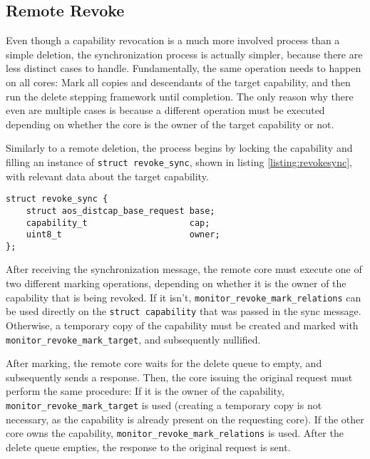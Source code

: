 \subsection{Remote Revoke}
Even though a capability revocation is a much more involved process than a simple deletion, the synchronization process is actually simpler, because there are less distinct cases to handle. Fundamentally, the same operation needs to happen on all cores: Mark all copies and descendants of the target capability, and then run the delete stepping framework until completion. The only reason why there even are multiple cases is because a different operation must be executed depending on whether the core is the owner of the target capability or not.

Similarly to a remote deletion, the process begins by locking the capability and filling an instance of \texttt{struct revoke\_sync}, shown in listing \ref{listing:revokesync}, with relevant data about the target capability.

\begin{lstlisting}[caption={Payload for revoke synchronization},label={listing:revokesync}]
struct revoke_sync {
    struct aos_distcap_base_request base;
    capability_t                    cap;
    uint8_t                         owner;
};
\end{lstlisting}

After receiving the synchronization message, the remote core must execute one of two different marking operations, depending on whether it is the owner of the capability that is being revoked. If it isn't, \texttt{monitor\_revoke\_mark\_relations} can be used directly on the \texttt{struct capability} that was passed in the sync message. Otherwise, a temporary copy of the capability must be created and marked with \texttt{monitor\_revoke\_mark\_target}, and subsequently nullified. 

After marking, the remote core waits for the delete queue to empty, and subsequently sends a response. Then, the core issuing the original request must perform the same procedure: If it is the owner of the capability, \texttt{monitor\_revoke\_mark\_target} is used (creating a temporary copy is not necessary, as the capability is already present on the requesting core). If the other core owns the capability, \texttt{monitor\_revoke\_mark\_relations} is used. After the delete queue empties, the response to the original request is sent.

